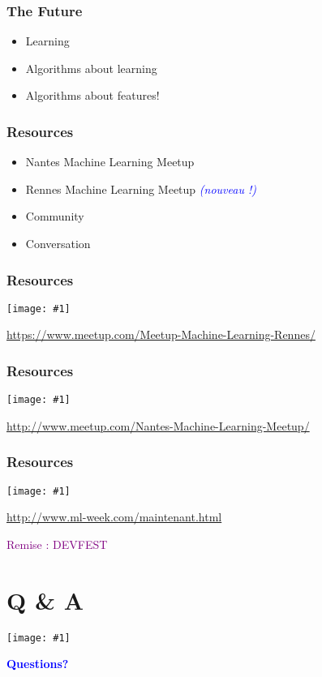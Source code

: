 \documentclass{beamer}
\newcommand\blue[1]{\textcolor{blue}{#1}}
\newcommand\purple[1]{\textcolor{purple}{#1}}
\newcommand\cimggg[1]{\vfill\centerline{\texttt{[image: \#1]}}\vfill}
\newcommand\cimgh[1]{\vfill\centerline{\texttt{[image: \#1]}}\vfill}
\newcommand\phrase[1]{\centerline{\huge\bf\blue{#1}}}
\begin{document}
\begin{frame}
  \frametitle{The Future}

  \begin{itemize}
  \item Learning
  \item Algorithms about learning
  \item Algorithms about features!
  \end{itemize}
\end{frame}

\begin{frame}
  \frametitle{Resources}

  \begin{itemize}
  \item Nantes Machine Learning Meetup
  \item Rennes Machine Learning Meetup \textit{\blue{(nouveau !)}}
  \item Community
  \item Conversation
  \end{itemize}
\end{frame}

\begin{frame}
  \frametitle{Resources}
  \cimggg{rmlm.png}

  \vspace{5mm}
  \centerline{\url{https://www.meetup.com/Meetup-Machine-Learning-Rennes/}}
\end{frame}

\begin{frame}
  \frametitle{Resources}
  \cimggg{nmlm.png}

  \vspace{5mm}
  \centerline{\url{http://www.meetup.com/Nantes-Machine-Learning-Meetup/}}
\end{frame}

\begin{frame}
  \frametitle{Resources}
  \cimggg{ml-week.png}

  \vspace{5mm}
  \centerline{\url{http://www.ml-week.com/maintenant.html}}
  \vspace{2mm}
  \centerline{\purple{Remise : DEVFEST}}
\end{frame}

\section{Q \& A}
\label{sec:qa}

\begin{frame}
  \cimgh{apple-pear.jpg}
  \vspace{-.25\textheight}
  \phrase{Questions?}
  \vspace{.25\textheight}
\end{frame}
\end{document}

